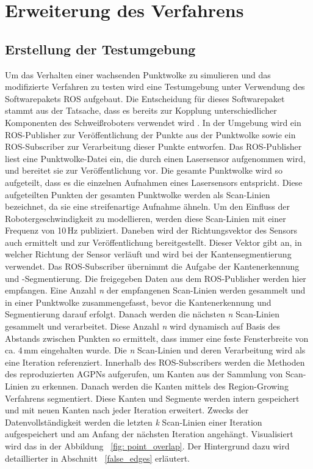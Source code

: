 
\section{Erweiterung des Verfahrens}
\subsection{Erstellung der Testumgebung} \label{Testumgebung}
Um das Verhalten einer wachsenden Punktwolke zu simulieren und das modifizierte Verfahren zu testen wird eine Testumgebung unter Verwendung des Softwarepakets ROS aufgebaut. Die Entscheidung für dieses Softwarepaket stammt aus der Tatsache, dass es bereits zur Kopplung unterschiedlicher Komponenten des Schweißroboters verwendet wird \autocite[39]{savla_intelligente_2022}. In der Umgebung wird ein ROS-Publisher zur Veröffentlichung der Punkte aus der Punktwolke sowie ein ROS-Subscriber zur Verarbeitung dieser Punkte entworfen. Das ROS-Publisher liest eine Punktwolke-Datei ein, die durch einen Lasersensor aufgenommen wird, und bereitet sie zur Veröffentlichung vor. Die gesamte Punktwolke wird so aufgeteilt, dass es die einzelnen Aufnahmen eines Lasersensors entspricht. Diese aufgeteilten Punkten der gesamten Punktwolke werden als Scan-Linien bezeichnet, da sie eine streifenartige Aufnahme ähneln. Um den Einfluss der Robotergeschwindigkeit zu modellieren, werden diese Scan-Linien mit einer Frequenz von 10\,Hz publiziert. Daneben wird der Richtungsvektor des Sensors auch ermittelt und zur Veröffentlichung bereitgestellt. Dieser Vektor gibt an, in welcher Richtung der Sensor verläuft und wird bei der Kantensegmentierung verwendet. Das ROS-Subscriber übernimmt die Aufgabe der Kantenerkennung und -Segmentierung. Die freigegeben Daten aus dem ROS-Publisher werden hier empfangen. Eine Anzahl \textit{n} der empfangenen Scan-Linien werden gesammelt und in einer Punktwolke zusammengefasst, bevor die Kantenerkennung und Segmentierung darauf erfolgt. Danach werden die nächsten \textit{n} Scan-Linien gesammelt und verarbeitet. Diese Anzahl \textit{n} wird dynamisch auf Basis des Abstands zwischen Punkten so ermittelt, dass immer eine feste Fensterbreite von ca. 4\,mm eingehalten wurde. Die \textit{n} Scan-Linien und deren Verarbeitung wird als eine Iteration referenziert. Innerhalb des ROS-Subscribers werden die Methoden des reproduzierten AGPNs aufgerufen, um Kanten aus der Sammlung von Scan-Linien zu erkennen. Danach werden die Kanten mittels des Region-Growing Verfahrens segmentiert. Diese Kanten und Segmente werden intern gespeichert und mit neuen Kanten nach jeder Iteration erweitert. Zwecks der Datenvollständigkeit werden die letzten \textit{k} Scan-Linien einer Iteration aufgespeichert und am Anfang der nächsten Iteration angehängt. Visualisiert wird das in der Abbildung ~\ref{fig: point_overlap}. Der Hintergrund dazu wird detaillierter in Abschnitt ~\ref{false_edges} erläutert.

